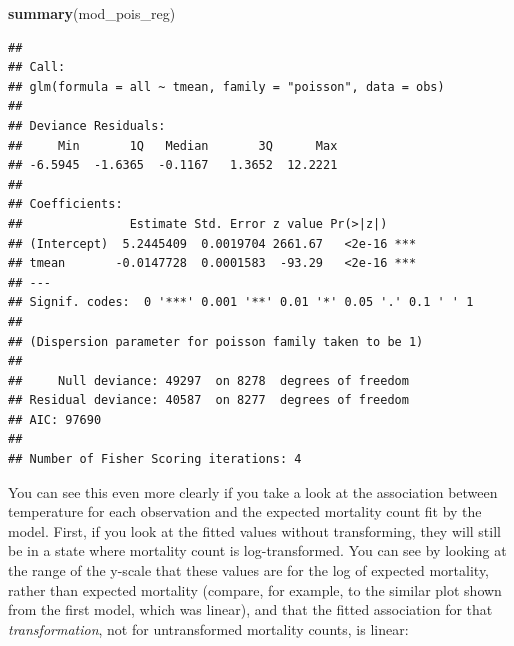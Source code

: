 \documentclass[
]{book}
\newenvironment{Shaded}{\begin{snugshade}}{\end{snugshade}}
\newcommand{\DataTypeTok}[1]{\textcolor[rgb]{0.13,0.29,0.53}{#1}}
\newcommand{\FloatTok}[1]{\textcolor[rgb]{0.00,0.00,0.81}{#1}}
\newcommand{\KeywordTok}[1]{\textcolor[rgb]{0.13,0.29,0.53}{\textbf{#1}}}
\newcommand{\NormalTok}[1]{#1}
\newcommand{\OperatorTok}[1]{\textcolor[rgb]{0.81,0.36,0.00}{\textbf{#1}}}
\newcommand{\StringTok}[1]{\textcolor[rgb]{0.31,0.60,0.02}{#1}}
\begin{document}
\begin{Shaded}
\begin{Highlighting}[]
\KeywordTok{summary}\NormalTok{(mod_pois_reg)}
\end{Highlighting}
\end{Shaded}

\begin{verbatim}
## 
## Call:
## glm(formula = all ~ tmean, family = "poisson", data = obs)
## 
## Deviance Residuals: 
##     Min       1Q   Median       3Q      Max  
## -6.5945  -1.6365  -0.1167   1.3652  12.2221  
## 
## Coefficients:
##               Estimate Std. Error z value Pr(>|z|)    
## (Intercept)  5.2445409  0.0019704 2661.67   <2e-16 ***
## tmean       -0.0147728  0.0001583  -93.29   <2e-16 ***
## ---
## Signif. codes:  0 '***' 0.001 '**' 0.01 '*' 0.05 '.' 0.1 ' ' 1
## 
## (Dispersion parameter for poisson family taken to be 1)
## 
##     Null deviance: 49297  on 8278  degrees of freedom
## Residual deviance: 40587  on 8277  degrees of freedom
## AIC: 97690
## 
## Number of Fisher Scoring iterations: 4
\end{verbatim}

You can see this even more clearly if you take a look at the association between
temperature for each observation and the expected mortality count fit by the
model. First, if you look at the fitted values without transforming, they
will still be in a state where mortality count is log-transformed. You can
see by looking at the range of the y-scale that these values are for the log
of expected mortality, rather than expected mortality (compare, for example, to
the similar plot shown from the first model, which was linear), and that the fitted
association for that \emph{transformation}, not for untransformed mortality counts, is linear:

\begin{Shaded}
\end{Shaded}
\end{document}
